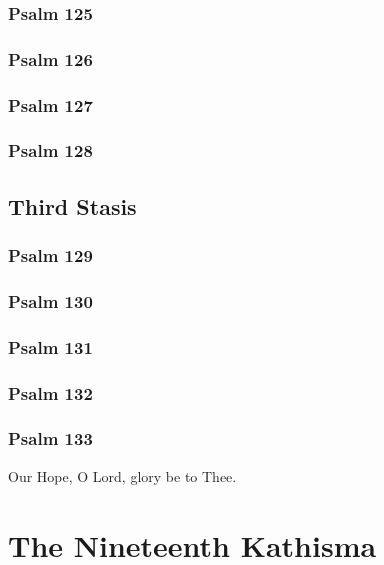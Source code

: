 \documentclass[12pt]{book}
\newcommand{\kathismabreak}{
  \medskip
  \begin{center}
  \begin{footnotesize}
  

  

  

  
  \end{footnotesize}
  \end{center}
  \smallbreak
}
\newcommand{\kathismaend}{
  \medskip
  \begin{center}
  \begin{footnotesize}
  

  

  Our Hope, O Lord, glory be to Thee.
  \end{footnotesize}
  \end{center}
  \smallbreak
}
\begin{document}
\subsubsection{Psalm 125}


\subsubsection{Psalm 126}


\subsubsection{Psalm 127}


\subsubsection{Psalm 128}


\kathismabreak

\subsection{Third Stasis}

\subsubsection{Psalm 129}


\subsubsection{Psalm 130}


\subsubsection{Psalm 131}


\subsubsection{Psalm 132}


\subsubsection{Psalm 133}


\kathismaend

\section{The Nineteenth Kathisma}
\end{document}

